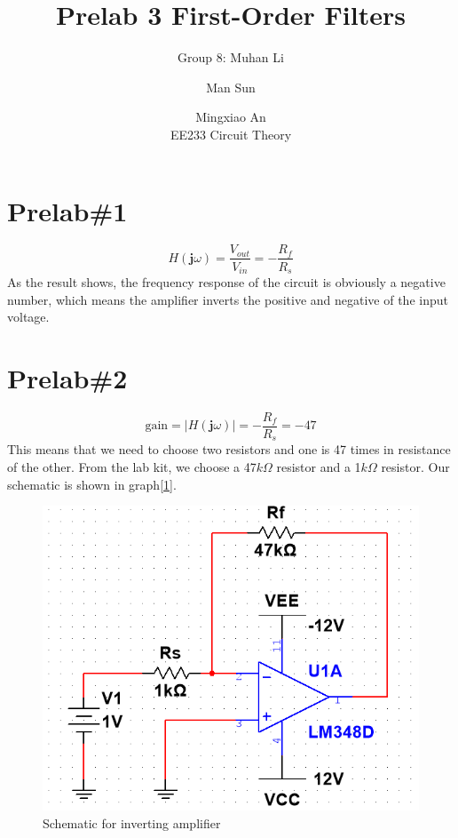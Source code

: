 \documentclass{IEEEtran}
\title{Prelab 3 First-Order Filters}
\author{Group 8: Muhan Li \and Man Sun \and Mingxiao An \\ EE233 Circuit Theory}
\begin{document}
	\maketitle
	\section{\textbf{Prelab\#1}}
	\begin{equation*}
		H(\mathbf{j}\omega) = \frac{V_{out}}{V_{in}} = -\frac{R_f}{R_s}
	\end{equation*}
	\phantom{ } As the result shows, the frequency response of the circuit is obviously a negative number, which means the amplifier inverts the positive and negative of the input voltage.\\
	\section{\textbf{Prelab\#2}}
	\begin{equation*}
		\mathrm{gain} = | H(\mathbf{j}\omega) | = -\frac{R_f}{R_s} = -47
	\end{equation*}
	\phantom{ } This means that we need to choose two resistors and one is 47 times in resistance of the other. From the lab kit, we choose a 47$ \si{k\Omega} $ resistor and a 1$ \si{k\Omega} $ resistor. Our schematic is shown in graph[\ref{fig:201}].
	
	\begin{figure}[!htbp]
		\centering
		\begin{framed}
			\includegraphics[width=\linewidth]{images/2_1.PNG}
			\caption{Schematic for inverting amplifier}
			\label{fig:201}
		\end{framed}
	\end{figure}
\end{document}
